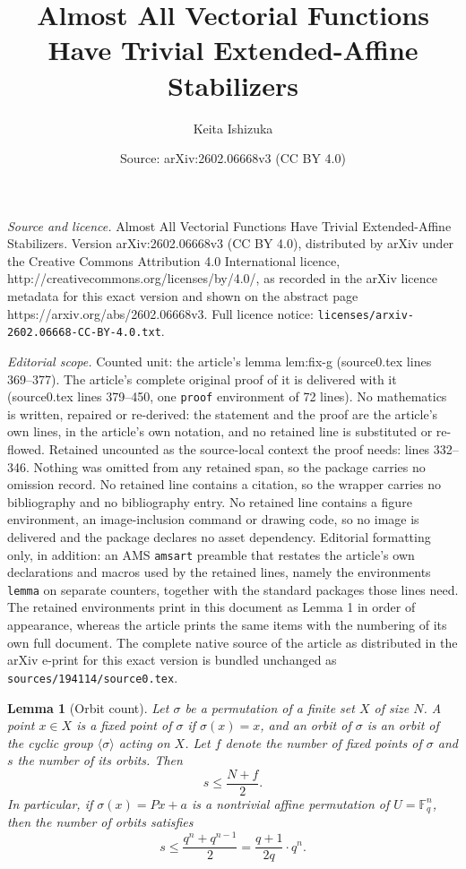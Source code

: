 \documentclass[10pt,a4paper]{amsart}
\title{Almost All Vectorial Functions Have Trivial Extended-Affine Stabilizers}
\author{Keita Ishizuka}
\date{Source: arXiv:2602.06668v3 (CC BY 4.0)}
\newtheorem{lemma}{Lemma}
\newcommand{\F}{\mathbb{F}}
\begin{document}
\maketitle

\noindent\emph{Source and licence.} Almost All Vectorial Functions Have Trivial Extended-Affine Stabilizers. Version arXiv:2602.06668v3 (CC BY 4.0), distributed by arXiv under the Creative Commons Attribution 4.0 International licence, http://creativecommons.org/licenses/by/4.0/, as recorded in the arXiv licence metadata for this exact version and shown on the abstract page https://arxiv.org/abs/2602.06668v3. Full licence notice: \texttt{licenses/arxiv-2602.06668-CC-BY-4.0.txt}.\par\smallskip

\noindent\textit{Editorial scope.} Counted unit: the article's lemma lem:fix-g (source0.tex lines 369--377). The article's complete original proof of it is delivered with it (source0.tex lines 379--450, one \texttt{proof} environment of 72 lines). No mathematics is written, repaired or re-derived: the statement and the proof are the article's own lines, in the article's own notation, and no retained line is substituted or re-flowed.  Retained uncounted as the source-local context the proof needs: lines 332--346.  Nothing was omitted from any retained span, so the package carries no omission record.  No retained line contains a citation, so the wrapper carries no bibliography and no bibliography entry.  No retained line contains a figure environment, an image-inclusion command or drawing code, so no image is delivered and the package declares no asset dependency.  Editorial formatting only, in addition: an AMS \texttt{amsart} preamble that restates the article's own declarations and macros used by the retained lines, namely the environments \texttt{lemma} on separate counters, together with the standard packages those lines need.  The retained environments print in this document as Lemma 1 in order of appearance, whereas the article prints the same items with the numbering of its own full document.  The complete native source of the article as distributed in the arXiv e-print for this exact version is bundled unchanged as \texttt{sources/194114/source0.tex}.
\begin{lemma}[Orbit count]\label{lem:orbit-count}
Let $\sigma$ be a permutation of a finite set $X$ of size $N$.
A point $x\in X$ is a \emph{fixed point of $\sigma$} if $\sigma(x)=x$, and an
\emph{orbit of $\sigma$} is an orbit of the cyclic group $\langle\sigma\rangle$ acting
on $X$. Let $f$ denote the number of fixed points of $\sigma$ and $s$ the number of its
orbits. Then
\[
   s\le \frac{N+f}{2}.
\]
In particular, if $\sigma(x)=Px+a$ is a nontrivial affine permutation of $U=\F_q^n$,
then the number of orbits satisfies
\[
   s\le \frac{q^n+q^{n-1}}{2} = \frac{q+1}{2q}\cdot q^n.
\]
\end{lemma}
\end{document}
